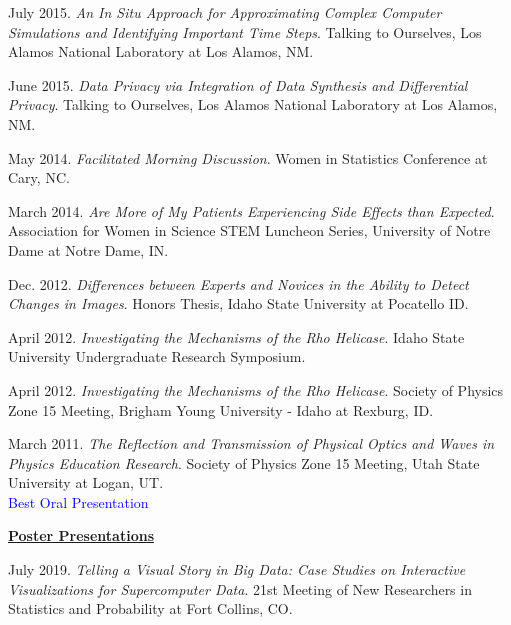 \documentclass[11pt, letterpaper, roman]{moderncv} %
\begin{document}
\begin{etaremune}[topsep=0pt, itemsep=6pt, partopsep=0pt, parsep=0pt]
    \item July 2015. \textit{An In Situ Approach for Approximating Complex Computer Simulations and Identifying Important Time Steps}. Talking to Ourselves, Los Alamos National Laboratory at Los Alamos, NM.
    
    \item June 2015. \textit{Data Privacy via Integration of Data Synthesis and Differential Privacy}. Talking to Ourselves, Los Alamos National Laboratory at Los Alamos, NM. 
    
    \item May 2014. \textit{Facilitated Morning Discussion}. Women in Statistics Conference at Cary, NC.
    
    \item March 2014. \textit{Are More of My Patients Experiencing Side Effects than Expected}. Association for Women in Science STEM Luncheon Series, University of Notre Dame at Notre Dame, IN.
    
    \item Dec. 2012. \textit{Differences between Experts and Novices in the Ability to Detect Changes in Images}. Honors Thesis, Idaho State University at Pocatello ID.
    
    \item April 2012. \textit{Investigating the Mechanisms of the Rho Helicase}. Idaho State University Undergraduate Research Symposium.
    
    \item April 2012. \textit{Investigating the Mechanisms of the Rho Helicase}. Society of Physics Zone 15 Meeting, Brigham Young University - Idaho at Rexburg, ID.
    
    \item March 2011. \textit{The Reflection and Transmission of Physical Optics and Waves in Physics Education Research}. Society of Physics Zone 15 Meeting, Utah State University at Logan, UT.\\
    \textcolor{blue}{Best Oral Presentation}
  
\vspace{10pt}
\hspace{-0.30in}\underline{\textbf{\large Poster Presentations}}\normalsize
    \item July 2019. \textit{Telling a Visual Story in Big Data: Case Studies on Interactive Visualizations for Supercomputer Data}. 21st Meeting of New Researchers in Statistics and Probability at Fort Collins, CO.
    

\end{etaremune}
\end{document}
